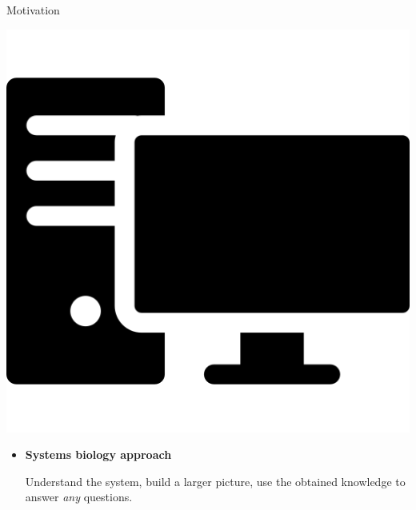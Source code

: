 \documentclass[10pt]{beamer}
\begin{document}
\begin{frame}[fragile]{Motivation}
\begin{minipage}{0.33\textwidth}
\begin{center}
\includegraphics[scale=0.1]{pics/classroom-pc.png}
\end{center}
\end{minipage}
\hfill
\begin{minipage}{0.66\textwidth}
\begin{itemize}
	\item \textbf{Systems biology approach}

	Understand the system, build a larger picture, use the obtained knowledge to answer \emph{any} questions.
\end{itemize}
\end{minipage}

\end{frame}

\end{document}
